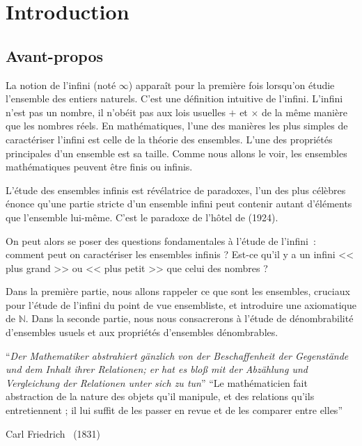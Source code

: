 \documentclass[a4paper,french,final]{memoir}
\begin{document}
\begin{titlingpage}

\end{titlingpage}
\frontmatter
\tableofcontents
\part{Introduction}

\chapter{Avant-propos}

La notion de l'infini (noté $\infty$) apparaît pour la première fois lorsqu'on étudie l'ensemble des entiers naturels. C'est une définition intuitive de l'infini. L'infini n'est pas un nombre, il n'obéit pas aux lois usuelles $+$ et $\times$ de la même manière que les nombres réels. En mathématiques, l'une des manières les plus simples de caractériser l'infini est celle de la théorie des ensembles. L'une des propriétés principales d'un ensemble est sa taille. Comme nous allons le voir, les ensembles mathématiques peuvent être finis ou infinis.

L'étude des ensembles infinis est révélatrice de paradoxes, l'un des plus célèbres  énonce qu'une partie stricte d'un ensemble infini peut contenir autant d'éléments que l'ensemble lui-même. C'est le paradoxe de l'hôtel de  (1924).

On peut alors se poser des questions fondamentales à l'étude de l'infini~: comment peut on caractériser les ensembles infinis ? Est-ce qu'il y a un infini << plus grand >> ou << plus petit >> que celui des nombres ?  

Dans la première partie, nous allons rappeler ce que sont les ensembles, cruciaux pour l'étude de l'infini du point de vue ensembliste, et introduire une axiomatique de $\mathbb{N}$. 
Dans la seconde partie, nous nous consacrerons à l'étude de dénombrabilité d'ensembles usuels et aux propriétés d'ensembles dénombrables.

\epigraph{%
	\enquote{\itshape Der Mathematiker abstrahiert gänzlich von der Beschaffenheit der Gegenstände und dem Inhalt ihrer Relationen; er hat es bloß mit der Abzählung und Vergleichung der Relationen unter sich zu tun}\newline \newline
\enquote{Le mathématicien fait abstraction de la nature des objets qu'il manipule, et des relations qu'ils entretiennent ; il lui suffit de les passer en revue et de les comparer entre elles}
}{Carl Friedrich \footnotemark~(1831)}
\end{document}
